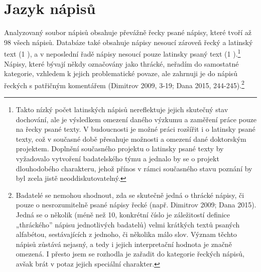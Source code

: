 \section[jazyk-nápisů]{Jazyk nápisů}

Analyzovaný soubor nápisů obsahuje převážně řecky psané nápisy, které tvoří až 98  všech nápisů. Databáze také obsahuje nápisy nesoucí zároveň řecký a latinský text (1 ), a v neposlední řadě nápisy nesoucí pouze latinsky psaný text (1 ).\footnote{Takto nízký počet latinských nápisů nereflektuje jejich skutečný stav dochování, ale je výsledkem omezení daného výzkumu a zaměření práce pouze na řecky psané texty. V budoucnosti je možné práci rozšířit i o latinsky psané texty, což v současné době přesahuje možnosti a omezení dané doktorským projektem. Doplnění současného projektu o latinsky psané texty by vyžadovalo vytvoření badatelského týmu a jednalo by se o projekt dlouhodobého charakteru, jehož přínos v rámci současného stavu poznání by byl zcela jistě neoddiskutovatelný.} Nápisy, které bývají někdy označovány jako thrácké, neřadím do samostatné kategorie, vzhledem k jejich problematické povaze, ale zahrnuji je do nápisů řeckých s patřičným komentářem (Dimitrov 2009, 3-19; Dana 2015, 244-245).\footnote{Badatelé se nemohou shodnout, zda se skutečně jedná o thrácké nápisy, či pouze o nesrozumitelně psané nápisy řecké (např. Dimitrov 2009; Dana 2015). Jedná se o několik (méně než 10, konkrétní číslo je záležitostí definice „thráckého” nápisu jednotlivých badatelů) velmi krátkých textů psaných alfabétou, sestávajících z jednoho, či několika málo slov. Význam těchto nápisů zůstává nejasný, a tedy i jejich interpretační hodnota je značně omezená. I přesto jsem se rozhodla je zařadit do kategorie řeckých nápisů, avšak brát v potaz jejich speciální charakter.}

